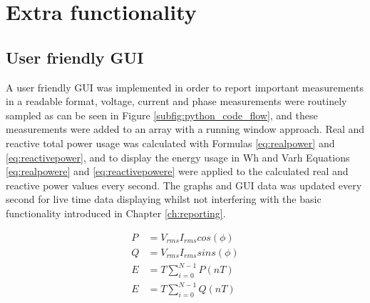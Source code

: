 \chapter{Extra functionality} \label{sec:extra_func}

\section{User friendly GUI} 
A user friendly GUI was implemented in order to report important measurements in a readable format, voltage, current and phase measurements were routinely sampled as can be seen in Figure \ref{subfig:python_code_flow}, and these measurements were added to an array with a running window approach. Real and reactive total power usage was calculated with Formulas \ref{eq:realpower} and \ref{eq:reactivepower}, and to display the energy usage in Wh and Varh Equations \ref{eq:realpowere} and \ref{eq:reactivepowere} were applied to the calculated real and reactive power values every second. The graphs and GUI data was updated every second for live time data displaying whilst not interfering with the basic functionality introduced in Chapter \ref{ch:reporting}.

\begin{align}
  P &= V_{rms}I_{rms}cos(\phi) \label{eq:realpower} \\
  Q &= V_{rms}I_{rms}sins(\phi) \label{eq:reactivepower} \\
  E &= T\sum_{i=0}^{N-1} P(nT)\label{eq:realpowere} \\
  E &= T\sum_{i=0}^{N-1} Q(nT)\label{eq:reactivepowere} 
\end{align}

